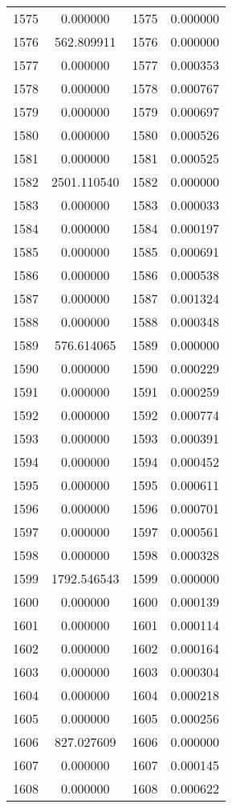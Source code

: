 \documentclass[12pt]{article}
\begin{document}
\begin{longtable}{@{}cccc@{}}
1575 & 0.000000 & 1575 & 0.000000 \\
1576 & 562.809911 & 1576 & 0.000000 \\
1577 & 0.000000 & 1577 & 0.000353 \\
1578 & 0.000000 & 1578 & 0.000767 \\
1579 & 0.000000 & 1579 & 0.000697 \\
1580 & 0.000000 & 1580 & 0.000526 \\
1581 & 0.000000 & 1581 & 0.000525 \\
1582 & 2501.110540 & 1582 & 0.000000 \\
1583 & 0.000000 & 1583 & 0.000033 \\
1584 & 0.000000 & 1584 & 0.000197 \\
1585 & 0.000000 & 1585 & 0.000691 \\
1586 & 0.000000 & 1586 & 0.000538 \\
1587 & 0.000000 & 1587 & 0.001324 \\
1588 & 0.000000 & 1588 & 0.000348 \\
1589 & 576.614065 & 1589 & 0.000000 \\
1590 & 0.000000 & 1590 & 0.000229 \\
1591 & 0.000000 & 1591 & 0.000259 \\
1592 & 0.000000 & 1592 & 0.000774 \\
1593 & 0.000000 & 1593 & 0.000391 \\
1594 & 0.000000 & 1594 & 0.000452 \\
1595 & 0.000000 & 1595 & 0.000611 \\
1596 & 0.000000 & 1596 & 0.000701 \\
1597 & 0.000000 & 1597 & 0.000561 \\
1598 & 0.000000 & 1598 & 0.000328 \\
1599 & 1792.546543 & 1599 & 0.000000 \\
1600 & 0.000000 & 1600 & 0.000139 \\
1601 & 0.000000 & 1601 & 0.000114 \\
1602 & 0.000000 & 1602 & 0.000164 \\
1603 & 0.000000 & 1603 & 0.000304 \\
1604 & 0.000000 & 1604 & 0.000218 \\
1605 & 0.000000 & 1605 & 0.000256 \\
1606 & 827.027609 & 1606 & 0.000000 \\
1607 & 0.000000 & 1607 & 0.000145 \\
1608 & 0.000000 & 1608 & 0.000622 \\

\end{longtable}
\end{document}
